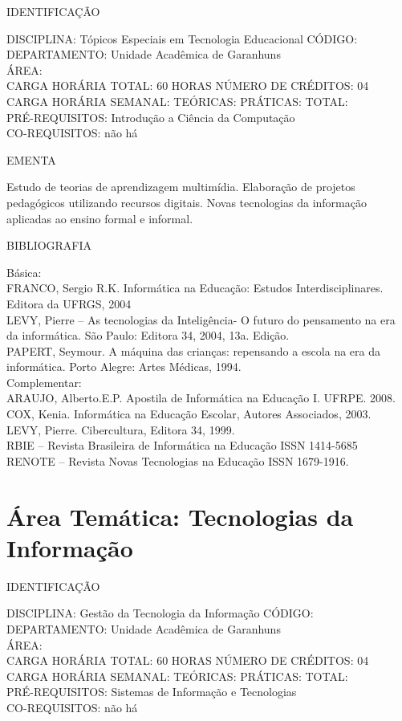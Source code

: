 \documentclass[
	12pt,				%
	openright,			%
  oneside,     %
	a4paper,			%
	english,			%
	french,				%
	spanish,			%
	brazil				%
	]{abntex2}
\begin{document}
\begin{apendicesenv}
\newpage IDENTIFICAÇÃO

DISCIPLINA: Tópicos Especiais em Tecnologia Educacional CÓDIGO:\\ 
DEPARTAMENTO: Unidade Acadêmica de Garanhuns\\ 
ÁREA: \\
CARGA HORÁRIA TOTAL: 60 HORAS NÚMERO DE CRÉDITOS: 04\\
CARGA HORÁRIA SEMANAL: TEÓRICAS: PRÁTICAS: TOTAL: \\
PRÉ-REQUISITOS: Introdução a Ciência da Computação\\
CO-REQUISITOS: não há

EMENTA 

Estudo de teorias de aprendizagem multimídia. Elaboração de projetos
pedagógicos utilizando recursos digitais. Novas tecnologias da
informação aplicadas ao ensino formal e informal.

BIBLIOGRAFIA 

Básica:\\
FRANCO, Sergio R.K. Informática na Educação: Estudos Interdisciplinares.
Editora da UFRGS, 2004\\
LEVY, Pierre -- As tecnologias da Inteligência- O futuro do pensamento
na era da informática. São Paulo: Editora 34, 2004, 13a. Edição.\\
PAPERT, Seymour. A máquina das crianças: repensando a escola na era da
informática. Porto Alegre: Artes Médicas, 1994.\\
Complementar:\\
ARAUJO, Alberto.E.P. Apostila de Informática na Educação I. UFRPE.
2008.\\
COX, Kenia. Informática na Educação Escolar, Autores Associados, 2003.\\
LEVY, Pierre. Cibercultura, Editora 34, 1999.\\
RBIE -- Revista Brasileira de Informática na Educação ISSN 1414-5685\\
RENOTE -- Revista Novas Tecnologias na Educação ISSN 1679-1916.
\newpage

\section*{Área Temática: Tecnologias da Informação}

IDENTIFICAÇÃO

DISCIPLINA: Gestão da Tecnologia da Informação CÓDIGO:\\ 
DEPARTAMENTO: Unidade Acadêmica de Garanhuns\\
ÁREA: \\
CARGA HORÁRIA TOTAL: 60 HORAS NÚMERO DE CRÉDITOS: 04\\
CARGA HORÁRIA SEMANAL: TEÓRICAS: PRÁTICAS: TOTAL: \\
PRÉ-REQUISITOS: Sistemas de Informação e Tecnologias\\
CO-REQUISITOS: não há


\end{apendicesenv}
\end{document}
